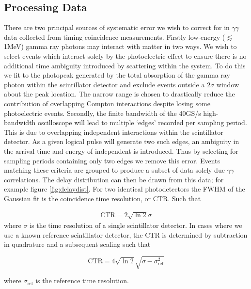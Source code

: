 \subsection{Processing Data}
There are two principal sources of systematic error we wish to correct for in $\gamma\gamma$ data collected from timing coincidence measurements. Firstly low-energy ($\lesssim$1MeV) gamma ray photons may interact with matter in two ways. We wish to select events which interact solely by the photoelectric effect to ensure there is no additional time ambiguity introduced by scattering within the system. To do this we fit to the photopeak generated by the total absorption of the gamma ray photon within the scintillator detector and exclude events outside a $2\sigma$ window about the peak location. The narrow range is chosen to drastically reduce the contribution of overlapping Compton interactions despite losing some photoelectric events. Secondly, the finite bandwidth of the 40GS/s high-bandwidth oscilloscope will lead to multiple `edges' recorded per sampling period. This is due to overlapping independent interactions within the scintillator detector. As a given logical pulse will generate two such edges, an ambiguity in the arrival time and energy of independent is introduced. Thus by selecting for sampling periods containing only two edges we remove this error. Events matching these criteria are grouped to produce a subset of data solely due $\gamma\gamma$ correlations. The delay distribution can then be drawn from this data; for example figure \ref{fig:delaydist}. For two identical photodetectors the FWHM of the Gaussian fit is the coincidence time resolution, or CTR. Such that

\begin{align}
\text{CTR} = 2\sqrt{\ln{2}}\sigma
\end{align}
where $\sigma$ is the time resolution of a single scintillator detector. In cases where we use a known reference scintillator detector, the CTR is determined by subtraction in quadrature and a subsequent scaling such that

\[
\text{CTR} = 4\sqrt{\ln{2}}\sqrt{\sigma-\sigma_\textrm{ref}^2}
\label{eqn:ctrfromref}
\]

where $\sigma_\text{ref}$ is the reference time resolution.

